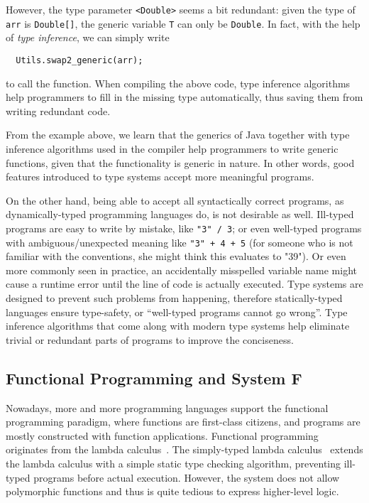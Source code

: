 However, the type parameter \verb|<Double>| seems a bit redundant:
given the type of \verb|arr| is \verb|Double[]|,
the generic variable \verb|T| can only be \verb|Double|.
In fact, with the help of \emph{type inference},
we can simply write
\begin{verbatim}
  Utils.swap2_generic(arr);
\end{verbatim}
to call the function.
When compiling the above code,
type inference algorithms help programmers to fill in the missing type automatically,
thus saving them from writing redundant code.

From the example above, we learn that the generics of Java
together with type inference algorithms used in the compiler
help programmers to write generic functions,
given that the functionality is generic in nature.
In other words, good features introduced to type systems
accept more meaningful programs.

On the other hand, being able to accept all syntactically correct programs,
as dynamically-typed programming languages do,
is not desirable as well.
Ill-typed programs are easy to write by mistake, like \verb|"3" / 3|;
or even well-typed programs with ambiguous/unexpected meaning like \verb|"3" + 4 + 5|
(for someone who is not familiar with the conventions, she might think this evaluates to "39").
Or even more commonly seen in practice,
an accidentally misspelled variable name might cause a runtime error until
the line of code is actually executed.
Type systems are designed to prevent such problems from happening,
therefore statically-typed languages
ensure type-safety, or ``well-typed programs cannot go wrong''.
Type inference algorithms that come along with modern type systems
help eliminate trivial or redundant parts of programs to
improve the conciseness.

\subsection{Functional Programming and System F}
Nowadays, more and more programming languages support the functional programming paradigm,
where functions are first-class citizens,
and programs are mostly constructed with function applications.
Functional programming originates from the
lambda calculus~\citep{alonzo1932lambda}.
The simply-typed lambda calculus~\citep{pierce2002types} extends the lambda calculus with
a simple static type checking algorithm,
preventing ill-typed programs before actual execution.
However, the system does not allow polymorphic functions and
thus is quite tedious to express higher-level logic.


